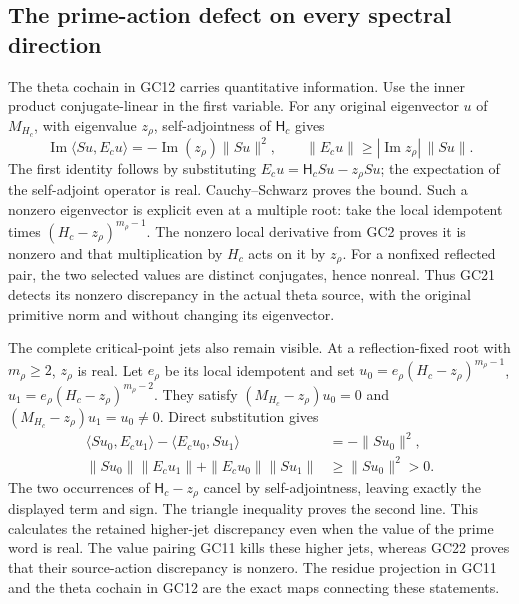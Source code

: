 \documentclass[11pt,a4paper]{article}
\theoremstyle{definition}\newtheorem{definition}[theorem]{Definition}
\begin{document}
\subsection{The prime-action defect on every spectral direction}
The theta cochain in GC12 carries quantitative information.
Use the inner product conjugate-linear in the first variable.
For any original eigenvector $u$ of $M_{H_c}$, with eigenvalue
$z_\rho$, self-adjointness of $\mathsf H_c$ gives
\[
 \operatorname{Im}\langle Su,E_cu\rangle
       =-\operatorname{Im}(z_\rho)\|Su\|^2,
 \qquad
 \|E_cu\|\ge |\operatorname{Im}z_\rho|\,\|Su\|.
 \tag{GC21}\label{gc:nonreal-defect}
\]
The first identity follows by substituting
$E_cu=\mathsf H_cSu-z_\rho Su$; the expectation of the
self-adjoint operator is real. Cauchy--Schwarz proves the bound.
Such a nonzero eigenvector is explicit even at a multiple root:
take the local idempotent times $(H_c-z_\rho)^{m_\rho-1}$.
The nonzero local derivative from GC2 proves it is nonzero and
that multiplication by $H_c$ acts on it by $z_\rho$.
For a nonfixed reflected pair, the two selected values are
distinct conjugates, hence nonreal. Thus GC21 detects its
nonzero discrepancy in the actual theta source, with the
original primitive norm and without changing its eigenvector.

The complete critical-point jets also remain visible. At a
reflection-fixed root with $m_\rho\ge2$, $z_\rho$ is real. Let
$e_\rho$ be its local idempotent and set
$u_0=e_\rho(H_c-z_\rho)^{m_\rho-1}$,
$u_1=e_\rho(H_c-z_\rho)^{m_\rho-2}$. They satisfy
$(M_{H_c}-z_\rho)u_0=0$ and
$(M_{H_c}-z_\rho)u_1=u_0\ne0$. Direct substitution gives
\[
\begin{split}
 \langle Su_0,E_cu_1\rangle-\langle E_cu_0,Su_1\rangle
       &=-\|Su_0\|^2,\\
 \|Su_0\|\|E_cu_1\|+\|E_cu_0\|\|Su_1\|
       &\ge\|Su_0\|^2>0.
\end{split}
 \tag{GC22}\label{gc:jet-defect}
\]
The two occurrences of $\mathsf H_c-z_\rho$ cancel by
self-adjointness, leaving exactly the displayed term and sign.
The triangle inequality proves the second line. This calculates
the retained higher-jet discrepancy even when the value of the
prime word is real. The value pairing GC11 kills these higher
jets, whereas GC22 proves that their source-action discrepancy
is nonzero. The residue projection in GC11 and the theta
cochain in GC12 are the exact maps connecting these statements.
\end{document}
